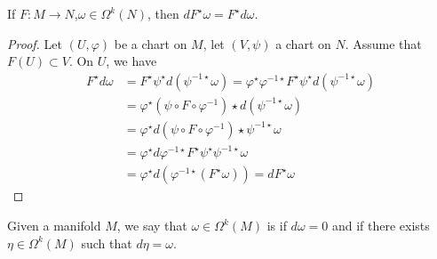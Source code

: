 \begin{corollary}[naturality]\label{cor:10.14}
    If \(F:M\to N\),\(\omega\in \Omega^k(N)\), then \(dF^\star\omega =F^\star d\omega\).    
\end{corollary}
\begin{proof}
    Let \((U,\varphi)\) be a chart on \(M\), let \((V,\psi)\) a chart on \(N\). Assume 
    that \(F(U)\subset V\). On \(U\), we have 
    \begin{align*}
        F^\star d\omega&=F^\star\psi^\star d(\psi^ {-1\star}\omega)=\varphi^\star\varphi^{-1\star}F^\star \psi^\star d(\psi^{-1\star}\omega)\\
        &=\varphi^{\star}(\psi\circ F\circ \varphi^{-1})\star d(\psi^{-1\star}\omega)\\
        &=\varphi^\star d(\psi\circ F\circ \varphi^{-1})\star \psi^{-1\star}\omega \\
        &=\varphi^\star d\varphi^{-1\star}F^\star \psi^\star \psi^{-1\star}\omega \\
        &=\varphi^\star d(\varphi^{-1\star}(F^\star\omega))=dF^\star \omega  
    \end{align*}
\end{proof}
\begin{definition*}
    Given a manifold \(M\), we say that \(\omega\in\Omega^k(M)\) is  if \(d\omega=0\)
    and  if there exists \(\eta\in \Omega^k(M)\) such that \(d\eta=\omega\).
\end{definition*}

